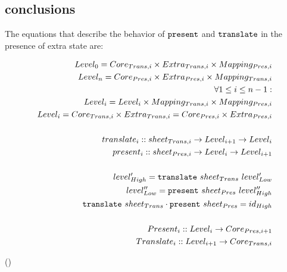 



%																
\subsection{conclusions}

The equations that describe the behavior of ${\tt present}$ and ${\tt translate}$ in the presence of extra state are:

\begin{small}\begin{align*}%
Level_{0} = Core_{Trans,i} \times Extra_{Trans,i} \times Mapping_{Pres,i}\\
Level_{n} = Core_{Pres,i} \times Extra_{Pres,i} \times Mapping_{Trans,i}\\
\forall 1 \le i \le n-1:  \\
Level_{i} = Level_{i} \times Mapping_{Trans,i} \times Mapping_{Pres,i}\\
Level_{i} = Core_{Trans,i} \times Extra_{Trans,i} = Core_{Pres,i} \times Extra_{Pres,i} \\
\\
translate_{i} :: sheet_{Trans,i} \rightarrow Level_{i+1} \rightarrow Level_{i}\\
present_{i} :: sheet_{Pres,i}  \rightarrow  Level_{i} \rightarrow Level_{i+1}\\
\\
level'_{High} = {\tt translate}~sheet_{Trans}~level'_{Low}\\
level''_{Low} = {\tt present}~sheet_{Pres}~level''_{High}\\
{\tt translate}~sheet_{Trans}  \cdot {\tt present}~sheet_{Pres} = id_{High}\\
\\
Present_{i} :: Level_{i} \rightarrow Core_{Pres,i+1}\\
Translate_{i} :: Level_{i+1} \rightarrow Core_{Trans,i}\\
\end{align*} 
\end{small}
{\centering ()\\}

